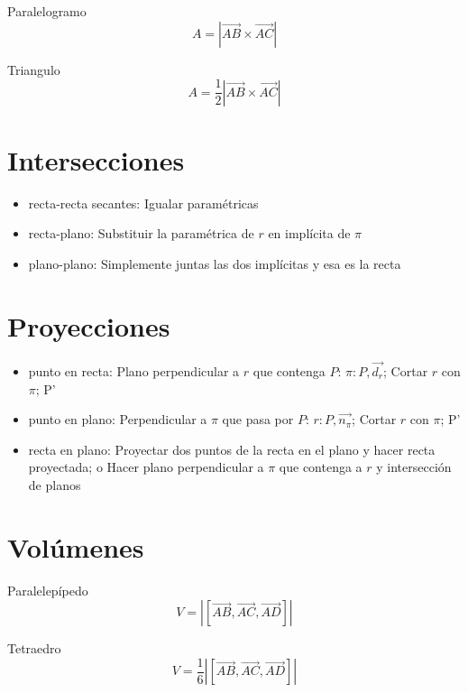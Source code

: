 \documentclass[12pt, letterpaper, twoside]{article}
\begin{document}
	Paralelogramo
	\begin{equation}
		A = |\vec{AB} \times \vec{AC}|
	\end{equation}
	
	Triangulo
	\begin{equation}
		A = \frac{1}{2} |\vec{AB} \times \vec{AC}|
	\end{equation}


	\section{Intersecciones}
	
	\begin{itemize}
		\item recta-recta secantes:
		Igualar paramétricas
		
		\item recta-plano:
		Substituir la paramétrica de $r$ en implícita de $\pi$
		
		\item plano-plano:
		Simplemente juntas las dos implícitas y esa es la recta
	\end{itemize}

	\section{Proyecciones}
	
	\begin{itemize}
		\item punto en recta:
		Plano perpendicular a $r$ que contenga $P$: $\pi: P, \vec{d_r}$;
		Cortar $r$ con $\pi$; P'
		
		\item punto en plano:
		Perpendicular a $\pi$ que pasa por $P$: $r: P, \vec{n_\pi}$;
		Cortar $r$ con $\pi$; P'
		
		\item recta en plano:
		Proyectar dos puntos de la recta en el plano y hacer recta proyectada; 
		o Hacer plano perpendicular a $\pi$ que contenga a $r$ y intersección de planos
	\end{itemize}


	\section{Volúmenes}

	Paralelepípedo
	\begin{equation}
		V = |[\vec{AB}, \vec{AC}, \vec{AD}]|
	\end{equation}
	
	Tetraedro 
	\begin{equation}
		V = \frac{1}{6} |[\vec{AB}, \vec{AC}, \vec{AD}]|
	\end{equation}
	
\end{document}
